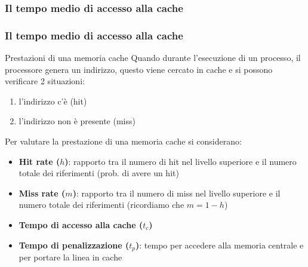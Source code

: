 \subsubsection[Il tempo medio di accesso alla cache]{Il tempo medio di accesso alla cache}
\begin{frame}
	\frametitle{Il tempo medio di accesso alla cache}
	
	\begin{block}{Prestazioni di una memoria cache}
		Quando durante l’esecuzione di un processo, il processore genera un indirizzo, questo viene cercato in cache e si possono verificare 2 situazioni: \pause
		\begin{enumerate}
			\item l’indirizzo c'è (hit) \pause
			\item l’indirizzo non è presente (miss) \pause
		\end{enumerate}
		Per valutare la prestazione di una memoria cache si considerano: \pause
		\begin{itemize}
			\item \textbf{Hit rate ($h$)}: rapporto tra il numero di hit nel livello superiore e il numero totale dei riferimenti (prob. di avere un hit) \pause
			\item \textbf{Miss rate ($m$)}: rapporto tra il numero di miss nel livello superiore e il numero totale dei riferimenti (ricordiamo che $m=1-h$) \pause
			\item \textbf{Tempo di accesso alla cache ($t_c$)} \pause
			\item \textbf{Tempo di penalizzazione ($t_p$)}: tempo per accedere alla memoria centrale e per portare la linea in cache
		\end{itemize}
	\end{block}
	
\end{frame}

